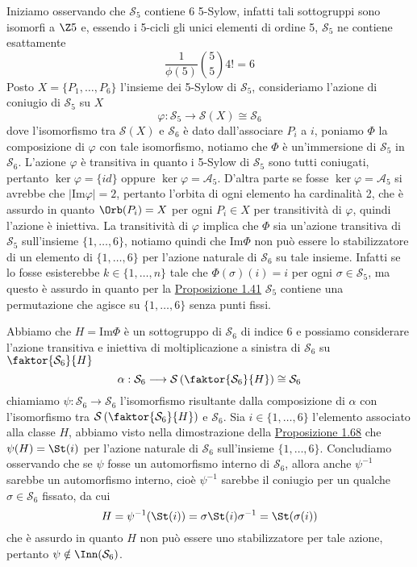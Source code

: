 \documentclass[11pt]{scrartcl}
\begin{document}
	Iniziamo osservando che $\mathcal{S}_5$ contiene 6 5-Sylow, infatti tali sottogruppi 
	sono isomorfi a $\Z5$ e, essendo i 5-cicli gli unici elementi di ordine 5,
	$\mathcal{S}_5$ ne contiene esattamente 
	\[
	\frac{1}{\phi(5)} \binom{5}{5}4! = 6
	\]
	Posto $X = \{P_1, \ldots, P_6\}$ l'insieme dei 5-Sylow di $\mathcal{S}_5$, consideriamo l'azione di coniugio 
	di $\mathcal{S}_5$ su $X$
	\[
	\varphi: \mathcal{S}_5 \longrightarrow \mathcal{S}(X) \cong \mathcal{S}_6
	\]
	dove l'isomorfismo tra $\mathcal{S}(X)$ e $\mathcal{S}_6$ è dato dall'associare $P_i$ a $i$, 
	poniamo $\Phi$ la composizione di $\varphi$ con tale isomorfismo, notiamo
	che $\Phi$ è un'immersione di $\mathcal{S}_5$ in $\mathcal{S}_6$. L'azione 
	$\varphi$ è transitiva in quanto i 5-Sylow di $\mathcal{S}_5$ sono tutti coniugati,
	pertanto $\ker\varphi = \{id\}$ oppure $\ker\varphi = \mathcal{A}_5$. D'altra parte
	se fosse $\ker\varphi = \mathcal{A}_5$ si avrebbe che $|\mathrm{Im}\varphi| = 2$,
	pertanto l'orbita di ogni elemento ha cardinalità 2, che è assurdo in quanto
	$\Orb(P_i) = X$ per ogni $P_i \in X$ per transitività di $\varphi$, quindi l'azione
	è iniettiva.\newline
	La transitività di $\varphi$ implica che $\Phi$ sia un'azione transitiva
	di $\mathcal{S}_5$ sull'insieme $\{1, \ldots, 6\}$, notiamo quindi che $\mathrm{Im}\Phi$
	non può essere lo stabilizzatore di un elemento di $\{1, \ldots, 6\}$
	per l'azione naturale di $\mathcal{S}_6$ su tale insieme. Infatti se lo fosse esisterebbe
	$k \in \{1, \ldots, n\}$ tale che $\Phi(\sigma)(i) = i$ per ogni $\sigma \in \mathcal{S}_5$,
	ma questo è assurdo in quanto per la \hyperref[prop1.41]{Proposizione 1.41} 
	$\mathcal{S}_5$ contiene una permutazione che agisce su $\{1, \ldots, 6\}$ senza punti
	fissi.
	
	Abbiamo che $H = \mathrm{Im}\Phi$ è un sottogruppo di $\mathcal{S}_6$ di indice $6$ e possiamo
	considerare l'azione transitiva e iniettiva di moltiplicazione a sinistra di $\mathcal{S}_6$ su 
	$\faktor{\mathcal{S}_6}{H}$
	\[
	\alpha: \mathcal{S}_6\longrightarrow\mathcal{S}\left(\faktor{\mathcal{S}_6}{H}\right) \cong \mathcal{S}_6
	\]
	chiamiamo $\psi: \mathcal{S}_6\longrightarrow \mathcal{S}_6$ l'isomorfismo risultante dalla
	composizione di $\alpha$ con l'isomorfismo tra $\mathcal{S}\left(\faktor{\mathcal{S}_6}{H}\right)$
	e $\mathcal{S}_6$. Sia $i \in \{1, \ldots, 6\}$ l'elemento associato alla classe $H$,
	abbiamo visto nella dimostrazione della \hyperref[prop1.68]{Proposizione 1.68}
	che $\psi(H) = \St(i)$ per l'azione naturale di $\mathcal{S}_6$ sull'insieme $\{1, \ldots, 6\}$.
	Concludiamo osservando che se $\psi$ fosse un automorfismo interno di $\mathcal{S}_6$,
	allora anche $\psi^{-1}$ sarebbe un automorfismo interno, cioè $\psi^{-1}$
	sarebbe il coniugio per un qualche $\sigma \in \mathcal{S}_6$ fissato, da cui
	\[
	H = \psi^{-1}(\St(i)) = \sigma\St(i)\sigma^{-1} = \St(\sigma(i))
	\]
	che è assurdo in quanto $H$ non può essere uno stabilizzatore per tale azione,
	pertanto $\psi \notin \Inn(\mathcal{S}_6)$.
	
\end{document}
